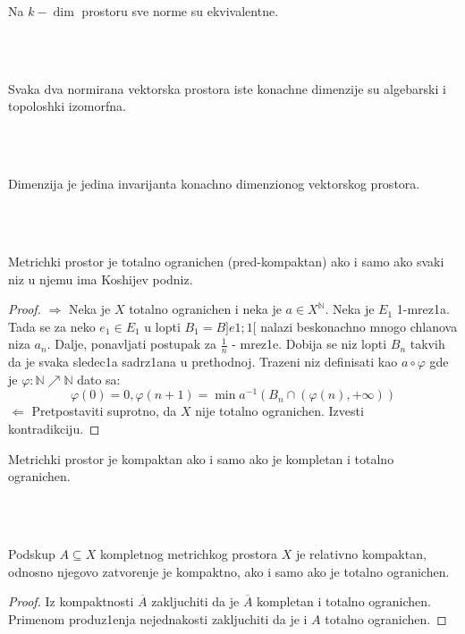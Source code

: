 \documentclass[a4paper,12pt]{article}
\newcommand{\NN}{\mathbb{N}}
\newcommand{\psj}{\subseteq}
\begin{document}
\begin{nap}
Na $k-\dim$ prostoru sve norme su ekvivalentne.
\end{nap}
\\ \\
\begin{posl}
Svaka dva normirana vektorska prostora iste konachne dimenzije su alge\-barski i topoloshki izomorfna.
\end{posl}
\\ \\
\begin{nap}
Dimenzija je jedina invarijanta konachno dimenzionog vektorskog prostora.
\end{nap}
\\ \\
\begin{tvr}
Metrichki prostor je totalno ogranichen (pred-kompaktan) ako i samo ako svaki niz u njemu ima Koshijev podniz.
\end{tvr}
\begin{proof}
$\boxed{\Rightarrow}$ Neka je $X$ totalno ogranichen i neka je $a \in X^{\NN}$. Neka je $E_1$ 1-mrez1a. Tada se za neko $e_1 \in E_1$ u lopti $B_1 = B]e1;1[$ nalazi beskonachno mnogo chlanova niza $a_n$. Dalje, ponavljati postupak za $\frac{1}{n}$ - mrez1e. Dobija se niz lopti $B_n$ takvih da je svaka sledec1a sadrz1ana u prethodnoj. Trazeni niz definisati kao $a \circ \varphi$ gde je $\varphi: \NN \nearrow \NN$ dato sa: \[\varphi(0) = 0, \varphi(n+1) = \min a^{-1} (B_n \cap (\varphi(n), + \infty))\]
$\boxed{\Leftarrow}$ Pretpostaviti suprotno, da $X$ nije totalno ogranichen. Izvesti kontradikciju.
\end{proof}

\begin{posl}
Metrichki prostor je kompaktan ako i samo ako je kompletan i totalno ogranichen.
\end{posl}
\\ \\
\begin{tvr}
Podskup $A \psj X$ kompletnog metrichkog prostora $X$ je relativno kompaktan, odnosno njegovo zatvorenje je kompaktno, ako i samo ako je totalno ogranichen.
\end{tvr}
\begin{proof}
Iz kompaktnosti $\overline{A}$ zakljuchiti da je $\overline{A}$ kompletan i totalno ogranichen. Primenom produz1enja nejednakosti zakljuchiti da je i $A$ totalno ogranichen.
\end{proof}
\end{document}
